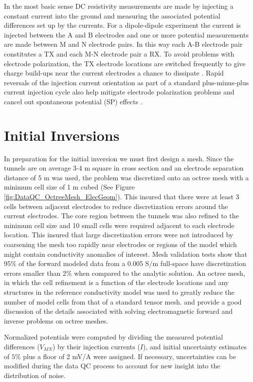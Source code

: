 \documentclass[final,authoryear,5p,times,twocolumn]{elsarticle}
\begin{document}
In the most basic sense DC resistivity measurements are made by injecting a constant current into the ground and measuring the associated potential differences set up by the currents. For a dipole-dipole experiment the current is injected between the A and B electrodes and one or more potential measurements are made between M and N electrode pairs. In this way each A-B electrode pair constitutes a TX and each M-N electrode pair a RX. To avoid problems with electrode polarization, the TX electrode locations are switched frequently to give charge build-ups near the current electrodes a chance to dissipate \citep{Dahlin2000}. Rapid reversals of the injection current orientation as part of a standard plus-minus-plus current injection cycle also help mitigate electrode polarization problems and cancel out spontaneous potential (SP) effects \citep{Telford1990, Dahlin2000}.

\section{Initial Inversions}
\label{Initial_Inv}
In preparation for the initial inversion we must first design a mesh. Since the tunnels are on average 3-4 m square in cross section and an electrode separation distance of 5 m was used, the problem was discretized onto an octree mesh with a minimum cell size of 1 m cubed (See Figure \ref{fig:DataQC_OctreeMesh_ElecGeom}). This insured that there were at least 3 cells between adjacent electrodes to reduce discretization errors around the current electrodes. The core region between the tunnels was also refined to the minimum cell size and 10 small cells were required adjacent to each electrode location. This insured that large discretization errors were not introduced by coarsening the mesh too rapidly near electrodes or regions of the model which might contain conductivity anomalies of interest. Mesh validation tests show that 95$\%$ of the forward modeled data from a 0.005 S/m full-space have discretization errors smaller than 2$\%$ when compared to the analytic solution. An octree mesh, in which the cell refinement is a function of the electrode locations and any structures in the reference conductivity model was used to greatly reduce the number of model cells from that of a standard tensor mesh. \cite{Haber2007} and \cite{Haber2012} provide a good discussion of the details associated with solving electromagnetic forward and inverse problems on octree meshes.

Normalized potentials were computed by dividing the measured potential differences ($V_{MN}$) by their injection currents ($I$), and initial uncertainty estimates of $5\%$ plus a floor of 2 mV/A were assigned. If necessary, uncertainties can be modified during the data QC process to account for new insight into the distribution of noise.
\end{document}
